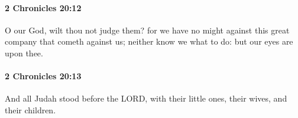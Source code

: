 		\paragraph{2 Chronicles 20:12} %
			\label{2CHRONICLES-20-12}

			O our God, wilt thou not judge them? for we have no might against this great company that cometh against us; neither know we what to do: but our eyes are upon thee.


		\paragraph{2 Chronicles 20:13} %
			\label{2CHRONICLES-20-13}

			And all Judah stood before the LORD, with their little ones, their wives, and their children.


